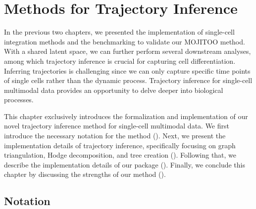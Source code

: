%
\chapter{Methods for Trajectory Inference}
\label{chapter:methods_TI}
\graphicspath{{chapter7/figs}}

In the previous two chapters, we presented the implementation of single-cell integration methods and the benchmarking to validate our MOJITOO method. With a shared latent space, we can further perform several downstream analyses, among which trajectory inference is crucial for capturing cell differentiation. Inferring trajectories is challenging since we can only capture specific time points of single cells rather than the dynamic process. Trajectory inference for single-cell multimodal data provides an opportunity to delve deeper into biological processes.

This chapter exclusively introduces the formalization and implementation of our novel trajectory inference method for single-cell multimodal data. We first introduce the necessary notation for the method (). Next, we present the implementation details of trajectory inference, specifically focusing on graph triangulation, Hodge decomposition, and tree creation (). Following that, we describe the implementation details of our package (). Finally, we conclude this chapter by discussing the strengths of our method ().


\section{Notation} \label{TI_methods:notation}

